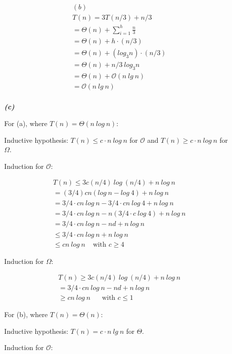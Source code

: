 \documentclass{article}
\begin{document}
\begin{enumerate}
\begin{enumerate}
		\begin{align*}
		& (b) \\
		& T(n) = 3T(n/3) + n/3 \\
		& = \Theta(n) + \sum_{i=1}^h \frac{n}{3} \\
		& = \Theta(n) + h \cdot (n/3) \\
		& = \Theta(n) + (log_3 n) \cdot (n/3) \\
		& = \Theta(n) + n/3\ log_3 n \\
		& = \Theta(n) + \mathcal{O}(n\ lg\ n) \\
		& = \mathcal{O}(n\ lg\ n) \\
		\end{align*}

		\item[\textbf{\emph{{(c)}}}]

		For (a), where $T(n) = \Theta(n\ log\ n)$:

		Inductive hypothesis: $T(n) \leq c \cdot n\ log\ n$ for $\mathcal{O}$ and $T(n) \geq c \cdot n\ log\ n$ for $\Omega$.

		Induction for $\mathcal{O}$:

		\begin{align*}
		& T(n) \leq 3c(n/4)\ log\ (n/4) + n\ log\ n \\
		&  = (3/4)cn(log\ n - log\ 4) + n\ log\ n \\
		&  = 3/4\cdot cn\ log\ n - 3/4\cdot cn\ log\ 4 + n\ log\ n \\
		&  = 3/4\cdot cn\ log\ n - n(3/4\cdot c\ log\ 4) + n\ log\ n \\
		&  = 3/4\cdot cn\ log\ n - nd + n\ log\ n \\
		&  \leq 3/4\cdot cn\ log\ n + n\ log\ n \\
		&  \leq cn\ log\ n \ \ \ \ \ \text{with $c \geq 4$}
		\end{align*}

		Induction for $\Omega$:

		\begin{align*}
		& T(n) \geq 3c(n/4)\ log\ (n/4) + n\ log\ n \\
		&  = 3/4\cdot cn\ log\ n - nd + n\ log\ n \\
		&  \geq cn\ log\ n \ \ \ \ \ \ \text{ with $c \leq 1$}
		\end{align*}

		For (b), where $T(n) = \Theta(n)$:

		Inductive hypothesis: $T(n) = c \cdot n\ lg\ n$ for $\Theta$.

		Induction for $\mathcal{O}$:


\end{enumerate}
\end{enumerate}
\end{document}
